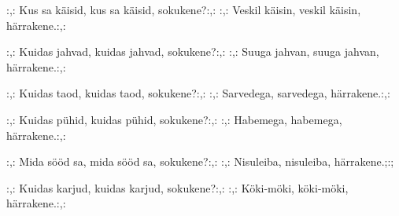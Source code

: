 :,: Kus sa k\"aisid, kus sa k\"aisid, sokukene?:,: 
:,: Veskil k\"aisin, veskil k\"aisin, h\"arrakene.:,: 

:,: Kuidas jahvad, kuidas jahvad, sokukene?:,: 
:,: Suuga jahvan, suuga jahvan, h\"arrakene.:,: 

:,: Kuidas taod, kuidas taod, sokukene?:,: 
:,: Sarvedega, sarvedega, h\"arrakene.:,: 

:,: Kuidas p\"uhid, kuidas p\"uhid, sokukene?:,: 
:,: Habemega, habemega, h\"arrakene.:,: 

:,: Mida s\"o\"od sa, mida s\"o\"od sa, sokukene?:,: 
:,: Nisuleiba, nisuleiba, h\"arrakene.;:;

:,: Kuidas karjud, kuidas karjud, sokukene?:,: 
:,: K\"oki-m\"oki, k\"oki-m\"oki, h\"arrakene.:,: 